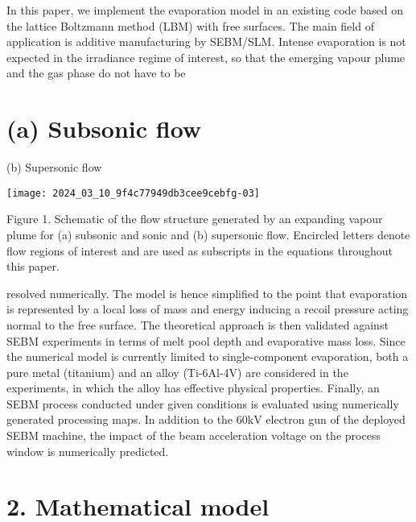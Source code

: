 \documentclass[10pt]{article}
\begin{document}
In this paper, we implement the evaporation model in an existing code based on the lattice Boltzmann method (LBM) with free surfaces. The main field of application is additive manufacturing by SEBM/SLM. Intense evaporation is not expected in the irradiance regime of interest, so that the emerging vapour plume and the gas phase do not have to be

\section*{(a) Subsonic flow}
(b) Supersonic flow

\begin{center}
\texttt{[image: 2024\_03\_10\_9f4c77949db3cee9cebfg-03]}
\end{center}

Figure 1. Schematic of the flow structure generated by an expanding vapour plume for (a) subsonic and sonic and (b) supersonic flow. Encircled letters denote flow regions of interest and are used as subscripts in the equations throughout this paper.

resolved numerically. The model is hence simplified to the point that evaporation is represented by a local loss of mass and energy inducing a recoil pressure acting normal to the free surface. The theoretical approach is then validated against SEBM experiments in terms of melt pool depth and evaporative mass loss. Since the numerical model is currently limited to single-component evaporation, both a pure metal (titanium) and an alloy (Ti-6Al-4V) are considered in the experiments, in which the alloy has effective physical properties. Finally, an SEBM process conducted under given conditions is evaluated using numerically generated processing maps. In addition to the $60 \mathrm{kV}$ electron gun of the deployed SEBM machine, the impact of the beam acceleration voltage on the process window is numerically predicted.

\section*{2. Mathematical model}
\end{document}
